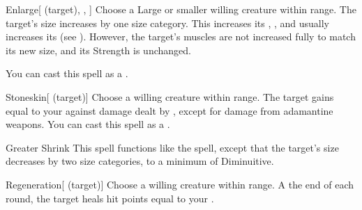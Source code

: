 \lowercase{\hypertarget{spell:Enlarge}{}}\label{spell:Enlarge}
\begin{ability}[\nth{3}]{\hypertarget{spell:Enlarge}{Enlarge}}[ (target), , ]
Choose a Large or smaller willing creature within \rngclose range.
The target's size increases by one size category.
This increases its , , and usually increases its  (see ).
However, the target's muscles are not increased fully to match its new size, and its Strength is unchanged.

You can cast this spell as a .
\end{ability}
\vspace{0.25em}



\lowercase{\hypertarget{spell:Stoneskin}{}}\label{spell:Stoneskin}
\begin{ability}[\nth{3}]{\hypertarget{spell:Stoneskin}{Stoneskin}}[ (target)]
Choose a willing creature within \rngclose range.
The target gains  equal to your  against damage dealt by , except for damage from adamantine weapons.
You can cast this spell as a .
\end{ability}
\vspace{0.25em}



\lowercase{\hypertarget{spell:Greater Shrink}{}}\label{spell:Greater Shrink}
\begin{ability}[\nth{4}]{\hypertarget{spell:Greater Shrink}{Greater Shrink}}
This spell functions like the  spell, except that the target's size decreases by two size categories, to a minimum of Diminuitive.
\end{ability}
\vspace{0.25em}



\lowercase{\hypertarget{spell:Regeneration}{}}\label{spell:Regeneration}
\begin{ability}[\nth{4}]{\hypertarget{spell:Regeneration}{Regeneration}}[ (target)]
Choose a willing creature within \rngclose range.
A the end of each round, the target heals hit points equal to your .
\end{ability}
\vspace{0.25em}



